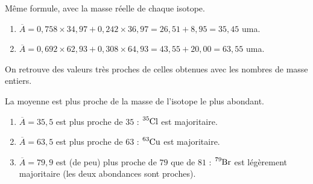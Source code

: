 \documentclass[11pt,a4paper]{article}
\begin{document}
\begin{corrige}
Même formule, avec la masse réelle de chaque isotope.
\begin{enumerate}[label=\alph*)]
  \item $\overline{A} = 0{,}758\times 34{,}97 + 0{,}242\times 36{,}97 = 26{,}51 + 8{,}95 = 35{,}45$ uma.
  \item $\overline{A} = 0{,}692\times 62{,}93 + 0{,}308\times 64{,}93 = 43{,}55 + 20{,}00 = 63{,}55$ uma.
\end{enumerate}
On retrouve des valeurs très proches de celles obtenues avec les nombres de masse entiers.
\end{corrige}

\begin{corrige}
La moyenne est plus proche de la masse de l'isotope le plus abondant.
\begin{enumerate}[label=\alph*)]
  \item $\overline{A} = 35{,}5$ est plus proche de $35$ : \textbf{$\ce{^{35}Cl}$} est majoritaire.
  \item $\overline{A} = 63{,}5$ est plus proche de $63$ : \textbf{$\ce{^{63}Cu}$} est majoritaire.
  \item $\overline{A} = 79{,}9$ est (de peu) plus proche de $79$ que de $81$ : \textbf{$\ce{^{79}Br}$}
        est légèrement majoritaire (les deux abondances sont proches).
\end{enumerate}
\end{corrige}
\end{document}
